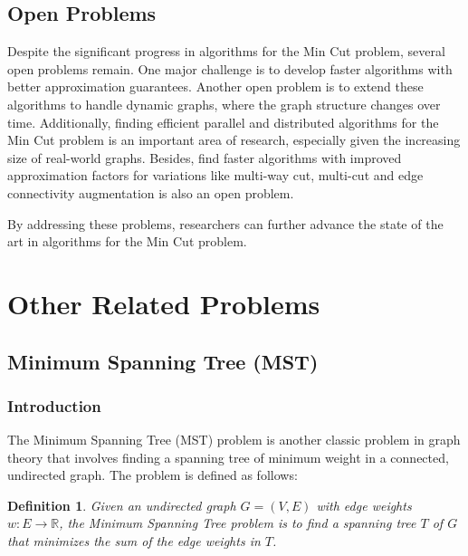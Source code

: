\documentclass[11pt]{article}
\theoremstyle{plain}
\newtheorem{definition}{Definition}[section]
\begin{document}

\subsection{Open Problems}

Despite the significant progress in algorithms for the Min Cut problem, several open problems remain. One major challenge is to develop faster algorithms with better approximation guarantees. Another open problem is to extend these algorithms to handle dynamic graphs, where the graph structure changes over time. Additionally, finding efficient parallel and distributed algorithms for the Min Cut problem is an important area of research, especially given the increasing size of real-world graphs. Besides, find faster algorithms with improved approximation factors for variations like multi-way cut, multi-cut and edge connectivity augmentation is also an open problem.

By addressing these problems, researchers can further advance the state of the art in algorithms for the Min Cut problem.

\section{Other Related Problems}

\subsection{Minimum Spanning Tree (MST)}

\subsubsection{Introduction}

The Minimum Spanning Tree (MST) problem is another classic problem in graph theory that involves finding a spanning tree of minimum weight in a connected, undirected graph. The problem is defined as follows:

\begin{definition}
    Given an undirected graph $G=(V,E)$ with edge weights $w:E\to \mathbb{R}$, the Minimum Spanning Tree problem is to find a spanning tree $T$ of $G$ that minimizes the sum of the edge weights in $T$.
\end{definition}
\end{document}
